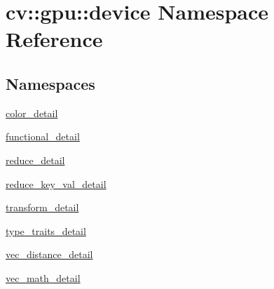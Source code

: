 \hypertarget{namespacecv_1_1gpu_1_1device}{\section{cv\-:\-:gpu\-:\-:device Namespace Reference}
\label{namespacecv_1_1gpu_1_1device}
}
\subsection*{Namespaces}
\begin{DoxyCompactItemize}
\item 
\hyperlink{namespacecv_1_1gpu_1_1device_1_1color__detail}{color\-\_\-detail}
\item 
\hyperlink{namespacecv_1_1gpu_1_1device_1_1functional__detail}{functional\-\_\-detail}
\item 
\hyperlink{namespacecv_1_1gpu_1_1device_1_1reduce__detail}{reduce\-\_\-detail}
\item 
\hyperlink{namespacecv_1_1gpu_1_1device_1_1reduce__key__val__detail}{reduce\-\_\-key\-\_\-val\-\_\-detail}
\item 
\hyperlink{namespacecv_1_1gpu_1_1device_1_1transform__detail}{transform\-\_\-detail}
\item 
\hyperlink{namespacecv_1_1gpu_1_1device_1_1type__traits__detail}{type\-\_\-traits\-\_\-detail}
\item 
\hyperlink{namespacecv_1_1gpu_1_1device_1_1vec__distance__detail}{vec\-\_\-distance\-\_\-detail}
\item 
\hyperlink{namespacecv_1_1gpu_1_1device_1_1vec__math__detail}{vec\-\_\-math\-\_\-detail}
\end{DoxyCompactItemize}
